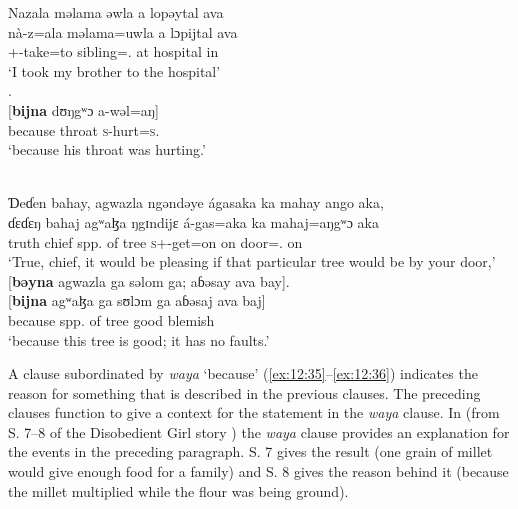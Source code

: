 \ea \label{ex:12:33}
Nazala  məlama  əwla  a  lopəytal  ava\\  
\gll  nà-z=ala    məlama=uwla    a  lɔpijtal  ava \\ 
      {\oneS}+{\PFV}-take=to  sibling={\oneS}.{\POSS}  at  hospital  in \\ 
\glt ‘I took my brother to the hospital’\\
      
      .\\      
\gll {}[\textbf{bijna}  dʊŋgʷɔ   a-wəl=aŋ]\\
     because  throat  \textsc{s}-hurt=\textsc{s}.{\IO}\\
\glt  ‘because his throat was hurting.’ 
\z 

\ea \label{ex:12:34}
\\
Ɗeɗen  bahay,  agwazla  ngəndəye  ágasaka  ka  mahay  ango  aka,\\  
\gll  ɗɛɗɛŋ  bahaj  agʷaɮa  ŋgɪndijɛ  á-gas=aka  ka  mahaj=aŋgʷɔ aka\\ 
      truth  chief {spp. of tree} {\DEM} \textsc{s}+{\IFV}-get=on  on  door={\twoS}.{\POSS}  on \\ 
\glt ‘True, chief, it would be pleasing if that particular tree would be by your door,’\\      
      
      \medskip
 {}[\textbf{bəyna}  agwazla  ga  səlom  ga; aɓəsay  ava  bay].\\     
\gll {}[\textbf{bijna} agʷaɮa ga sʊlɔm ga aɓəsaj ava baj]\\      
     because {spp. of tree}  {\ADJ} good  {\ADJ}   blemish   {\EXT}  {\NEG}\\ 
\glt  ‘because this tree is good;  it has no faults.’
\z 

\largerpage
A clause subordinated by \textit{waya} ‘because’ (\ref{ex:12:35}{}--\ref{ex:12:36}) indicates the reason for something that is described in the previous clauses. The preceding clauses function to give a context for the statement in the \textit{waya} clause. In  (from S. 7--8 of the Disobedient Girl story ) the \textit{waya} clause provides an explanation for the events in the preceding paragraph. S. 7 gives the result (one grain of millet would give enough food for a family) and S. 8 gives the reason behind it (because the millet multiplied while the flour was being ground).

